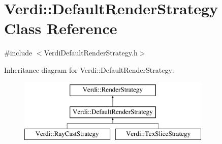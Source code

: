 \hypertarget{class_verdi_1_1_default_render_strategy}{\section{\-Verdi\-:\-:\-Default\-Render\-Strategy \-Class \-Reference}
\label{class_verdi_1_1_default_render_strategy}
}


{\ttfamily \#include $<$\-Verdi\-Default\-Render\-Strategy.\-h$>$}

\-Inheritance diagram for \-Verdi\-:\-:\-Default\-Render\-Strategy\-:\begin{figure}[H]
\begin{center}
\leavevmode
\includegraphics[height=3.000000cm]{class_verdi_1_1_default_render_strategy}
\end{center}
\end{figure}
